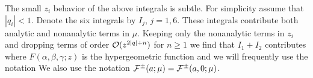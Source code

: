 The small $z_i$ behavior of the above integrals is subtle. 
For simplicity assume that $|q_i|<1$. 
%
%
Denote the six integrals by $I_j$, $j=1,6$. 
These integrals contribute both analytic and nonanalytic terms in 
$\mu$. Keeping only the nonanalytic terms in $z_i$ and dropping
terms of order ${\cal O}(z^{2|q|+n})$ for $n\geq 1$ we find that 
$I_1+I_2$ contributes
\eqn{}
where $F(\alpha,\beta,\gamma;z)$ is the hypergeometric
function and 
we will frequently use the notation
\eqn{}
We also use the notation ${\cal F}^\pm(a;\mu)={\cal F}^\pm(a,0;\mu)$. 


